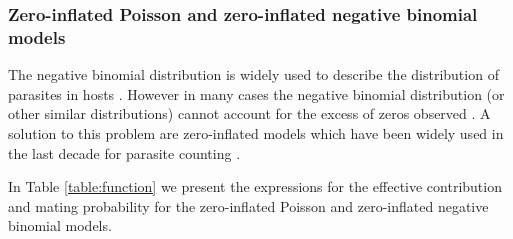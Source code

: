 \documentclass[useAMS,referee,usenatbib]{biom}
\begin{document}
\subsubsection{Zero-inflated Poisson and zero-inflated negative binomial models}

The negative binomial distribution is widely used to describe the distribution of parasites in hosts \cite{crofton1971quantitative,seo1979frequency}.
However in many cases the negative binomial distribution (or other similar distributions) cannot account for the excess of zeros observed \cite{crofton1971quantitative}. A solution to this problem are  zero-inflated models which have been widely used in the last decade for parasite counting \cite{abdybekova2012frequency,denwood2008distribution,ziadinov2010frequency}. 

In Table \ref{table:function}  we present the expressions for the effective contribution  and mating probability for the zero-inflated Poisson and zero-inflated negative binomial models.


\end{document}
